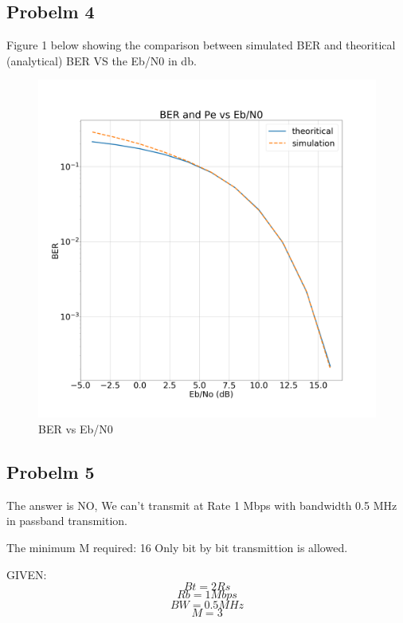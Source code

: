 \documentclass[a4paper,12pt]{report}
\begin{document}
    
    \subsection{Probelm 4}
        Figure 1 below showing the comparison between simulated BER and theoritical (analytical) BER
        VS the Eb/N0 in db.
        \begin{figure}[h!]
            \includegraphics[width=\linewidth]{Figures/Figure_1.png}
            \caption{BER vs Eb/N0}
            \label{fig:BER}
        \end{figure}

    \subsection{Probelm 5}
        The answer is NO,
        We can't transmit at Rate 1 Mbps with bandwidth 0.5 MHz in passband transmition.

        The minimum M required: 16
        Only bit by bit transmittion is allowed.

        GIVEN:
        \begin{equation*}
            Bt = 2Rs
        \end{equation*}
        \begin{equation*}
            Rb = 1 Mbps
        \end{equation*}
        \begin{equation*}
            BW = 0.5 MHz
        \end{equation*}
        \begin{equation*}
            M = 3
        \end{equation*}
\end{document}
